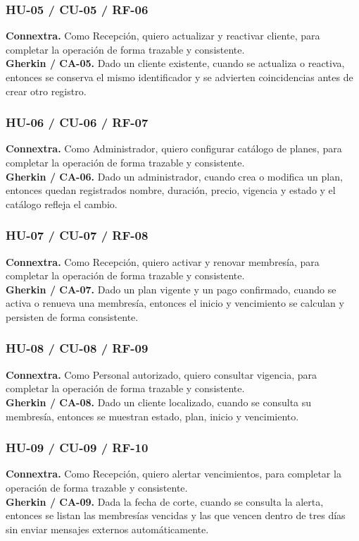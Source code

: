 \documentclass[11pt,a4paper,twoside]{article}
\begin{document}
\subsubsection{HU-05 / CU-05 / RF-06}
\textbf{Connextra.} Como Recepción, quiero actualizar y reactivar cliente, para completar la operación de forma trazable y consistente.\\
\textbf{Gherkin / CA-05.} Dado un cliente existente, cuando se actualiza o reactiva, entonces se conserva el mismo identificador y se advierten coincidencias antes de crear otro registro.
\subsubsection{HU-06 / CU-06 / RF-07}
\textbf{Connextra.} Como Administrador, quiero configurar catálogo de planes, para completar la operación de forma trazable y consistente.\\
\textbf{Gherkin / CA-06.} Dado un administrador, cuando crea o modifica un plan, entonces quedan registrados nombre, duración, precio, vigencia y estado y el catálogo refleja el cambio.
\subsubsection{HU-07 / CU-07 / RF-08}
\textbf{Connextra.} Como Recepción, quiero activar y renovar membresía, para completar la operación de forma trazable y consistente.\\
\textbf{Gherkin / CA-07.} Dado un plan vigente y un pago confirmado, cuando se activa o renueva una membresía, entonces el inicio y vencimiento se calculan y persisten de forma consistente.
\subsubsection{HU-08 / CU-08 / RF-09}
\textbf{Connextra.} Como Personal autorizado, quiero consultar vigencia, para completar la operación de forma trazable y consistente.\\
\textbf{Gherkin / CA-08.} Dado un cliente localizado, cuando se consulta su membresía, entonces se muestran estado, plan, inicio y vencimiento.
\subsubsection{HU-09 / CU-09 / RF-10}
\textbf{Connextra.} Como Recepción, quiero alertar vencimientos, para completar la operación de forma trazable y consistente.\\
\textbf{Gherkin / CA-09.} Dada la fecha de corte, cuando se consulta la alerta, entonces se listan las membresías vencidas y las que vencen dentro de tres días sin enviar mensajes externos automáticamente.
\end{document}
